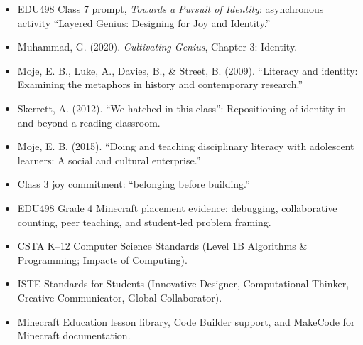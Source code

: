 \documentclass[11pt]{article}
\begin{document}
\begin{itemize}[leftmargin=*]
    \item EDU498 Class 7 prompt, \emph{Towards a Pursuit of Identity}: asynchronous activity ``Layered Genius: Designing for Joy and Identity.''
    \item Muhammad, G. (2020). \emph{Cultivating Genius}, Chapter 3: Identity.
    \item Moje, E. B., Luke, A., Davies, B., \& Street, B. (2009). ``Literacy and identity: Examining the metaphors in history and contemporary research.''
    \item Skerrett, A. (2012). ``We hatched in this class'': Repositioning of identity in and beyond a reading classroom.
    \item Moje, E. B. (2015). ``Doing and teaching disciplinary literacy with adolescent learners: A social and cultural enterprise.''
    \item Class 3 joy commitment: ``belonging before building.''
    \item EDU498 Grade 4 Minecraft placement evidence: debugging, collaborative counting, peer teaching, and student-led problem framing.
    \item CSTA K--12 Computer Science Standards (Level 1B Algorithms \& Programming; Impacts of Computing).
    \item ISTE Standards for Students (Innovative Designer, Computational Thinker, Creative Communicator, Global Collaborator).
    \item Minecraft Education lesson library, Code Builder support, and MakeCode for Minecraft documentation.
\end{itemize}
\end{document}
